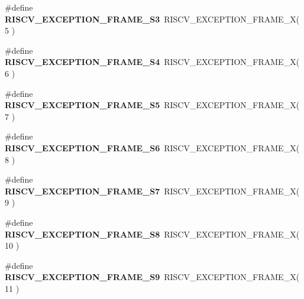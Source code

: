 \begin{DoxyCompactItemize}
\#define {\bfseries R\+I\+S\+C\+V\+\_\+\+E\+X\+C\+E\+P\+T\+I\+O\+N\+\_\+\+F\+R\+A\+M\+E\+\_\+\+S3}~R\+I\+S\+C\+V\+\_\+\+E\+X\+C\+E\+P\+T\+I\+O\+N\+\_\+\+F\+R\+A\+M\+E\+\_\+X( 5 )
\item 
\mbox{\label{group__RTEMSScoreCPURISCV_ga5c750ce78366a558205755c6fd5feac1}} 
\#define {\bfseries R\+I\+S\+C\+V\+\_\+\+E\+X\+C\+E\+P\+T\+I\+O\+N\+\_\+\+F\+R\+A\+M\+E\+\_\+\+S4}~R\+I\+S\+C\+V\+\_\+\+E\+X\+C\+E\+P\+T\+I\+O\+N\+\_\+\+F\+R\+A\+M\+E\+\_\+X( 6 )
\item 
\mbox{\label{group__RTEMSScoreCPURISCV_gac602ca4299e177e9f935e18860bc2876}} 
\#define {\bfseries R\+I\+S\+C\+V\+\_\+\+E\+X\+C\+E\+P\+T\+I\+O\+N\+\_\+\+F\+R\+A\+M\+E\+\_\+\+S5}~R\+I\+S\+C\+V\+\_\+\+E\+X\+C\+E\+P\+T\+I\+O\+N\+\_\+\+F\+R\+A\+M\+E\+\_\+X( 7 )
\item 
\mbox{\label{group__RTEMSScoreCPURISCV_ga6ae74f059fded3889ee053130e88ebb3}} 
\#define {\bfseries R\+I\+S\+C\+V\+\_\+\+E\+X\+C\+E\+P\+T\+I\+O\+N\+\_\+\+F\+R\+A\+M\+E\+\_\+\+S6}~R\+I\+S\+C\+V\+\_\+\+E\+X\+C\+E\+P\+T\+I\+O\+N\+\_\+\+F\+R\+A\+M\+E\+\_\+X( 8 )
\item 
\mbox{\label{group__RTEMSScoreCPURISCV_ga5f53b1f13ed05bb0fad704a05bf9a254}} 
\#define {\bfseries R\+I\+S\+C\+V\+\_\+\+E\+X\+C\+E\+P\+T\+I\+O\+N\+\_\+\+F\+R\+A\+M\+E\+\_\+\+S7}~R\+I\+S\+C\+V\+\_\+\+E\+X\+C\+E\+P\+T\+I\+O\+N\+\_\+\+F\+R\+A\+M\+E\+\_\+X( 9 )
\item 
\mbox{\label{group__RTEMSScoreCPURISCV_ga23fbfb507353278c0374d11be8da1b64}} 
\#define {\bfseries R\+I\+S\+C\+V\+\_\+\+E\+X\+C\+E\+P\+T\+I\+O\+N\+\_\+\+F\+R\+A\+M\+E\+\_\+\+S8}~R\+I\+S\+C\+V\+\_\+\+E\+X\+C\+E\+P\+T\+I\+O\+N\+\_\+\+F\+R\+A\+M\+E\+\_\+X( 10 )
\item 
\mbox{\label{group__RTEMSScoreCPURISCV_ga5dd986c1f8fabba4cac418bb5bb5dc03}} 
\#define {\bfseries R\+I\+S\+C\+V\+\_\+\+E\+X\+C\+E\+P\+T\+I\+O\+N\+\_\+\+F\+R\+A\+M\+E\+\_\+\+S9}~R\+I\+S\+C\+V\+\_\+\+E\+X\+C\+E\+P\+T\+I\+O\+N\+\_\+\+F\+R\+A\+M\+E\+\_\+X( 11 )
\item 
\mbox{\label{group__RTEMSScoreCPURISCV_gad70ae399ce035f097d4a656f6fffceb7}} 

\end{DoxyCompactItemize}
